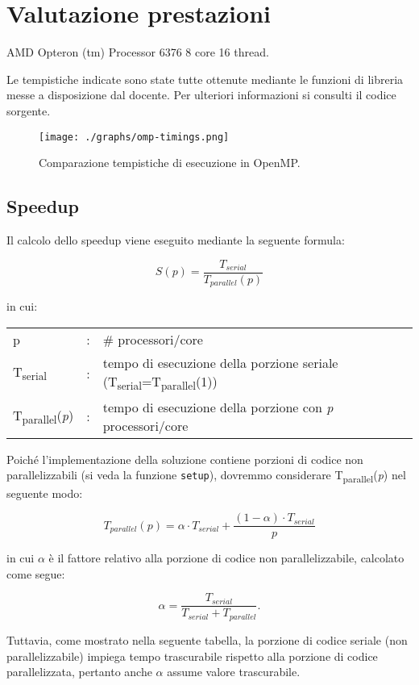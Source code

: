 \section{Valutazione prestazioni}
AMD Opteron (tm) Processor 6376 8 core 16 thread.

Le tempistiche indicate sono state tutte ottenute mediante le funzioni di
libreria messe a disposizione dal docente. Per ulteriori informazioni si
consulti il codice sorgente.

\begin{figure}[!ht]
  \centering
  \texttt{[image: ./graphs/omp-timings.png]}
  \caption{Comparazione tempistiche di esecuzione in OpenMP.}\label{fig:timings1}
\end{figure}

\subsection{Speedup}

Il calcolo dello speedup viene eseguito mediante la seguente formula:

\[ 
    S(p) = \frac{T_{serial}}{T_{parallel}(p)}
\]

in cui:
\begin{table}[ht]
\begin{tabular}{lll}
    p & : & \# processori/core\\
    T\textsubscript{serial}& : & tempo di esecuzione della porzione seriale
    (T\textsubscript{serial}=T\textsubscript{parallel}(1))\\
    T\textsubscript{parallel}(\textit{p}) & : & tempo di esecuzione della porzione con
    \textit{p} processori/core
\end{tabular}
\end{table}

Poiché l'implementazione della soluzione contiene porzioni di codice non
parallelizzabili (si veda la funzione \texttt{setup}), dovremmo considerare
T\textsubscript{parallel}(\textit{p}) nel seguente modo:

\[ 
T_{parallel}(p) = \alpha \cdot T_{serial} +  \frac{(1 - \alpha) \cdot
T_{serial}}{p}
\]

in cui $\alpha$ è il fattore relativo alla porzione di codice non
parallelizzabile, calcolato come segue:

\[ 
\alpha = \frac{T_{serial}}{T_{serial} + T_{parallel}}.
\]

Tuttavia, come mostrato nella seguente tabella, la porzione di codice seriale
(non parallelizzabile) impiega tempo trascurabile rispetto alla porzione di
codice parallelizzata, pertanto anche $\alpha$ assume valore trascurabile.

